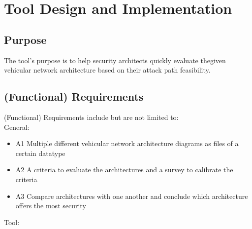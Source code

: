 \chapter{Tool Design and Implementation}
\label{chp:tool}

\section{Purpose}\label{sec:purpose}

The tool's purpose is to help security architects quickly evaluate thegiven vehicular network architecture based on their \gls{attack path} feasibility.

\section{(Functional) Requirements}\label{sec:funct-req}

(Functional) Requirements include but are not limited to:\\

General:

\begin{itemize}
	\item A1\label{sec:a1} Multiple different vehicular network architecture diagrams as files of a certain datatype 
	\item A2\label{sec:a2} A criteria to evaluate the architectures and a survey to calibrate the criteria
	\item A3\label{sec:a3} Compare architectures with one another and conclude which architecture offers the most security
\end{itemize}

Tool:


